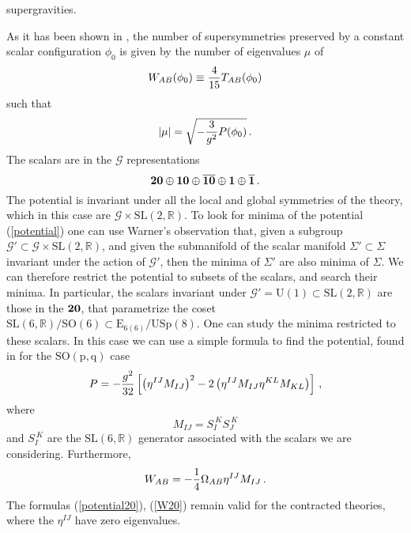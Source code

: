\documentclass[a4paper,12pt]{article}
\def\bar{\overline}\end {picture}}
\begin{document}
supergravities.
\par
As it has been shown in \cite{gunwar}, the number of
supersymmetries preserved by a constant scalar configuration
$\phi_0$ is given by the number of eigenvalues $\mu$ of
\begin{equation}
W_{AB}(\phi_0)\equiv {4\over 15}T_{AB}(\phi_0)
\end{equation}
such that
\begin{equation}
\left|\mu\right|=\sqrt{-{3\over g^2}P(\phi_0)}\,.
\end{equation}
The scalars are in the $\mathcal{G}$ representations
\begin{equation}
\bf 20\oplus 10\oplus\bar{10}\oplus 1\oplus\bar{1}\,.
\end{equation}
The potential is invariant under all the local and global
symmetries of the theory, which in this case are
$\mathcal{G}\times \mathrm{SL}(2,\mathbb{R})$. To look for minima
of the potential (\ref{potential}) one can use Warner's
observation \cite{schur} that, given a subgroup
$\mathcal{G}'\subset\mathcal{G}\times \mathrm{SL}(2,\mathbb{R})$,
and given the submanifold of the scalar manifold
$\Sigma'\subset\Sigma$ invariant under the action of
$\mathcal{G}'$, then the minima of $\Sigma'$ are also minima of
$\Sigma$. We can therefore restrict the potential to subsets of
the scalars, and search their minima. In particular, the scalars
invariant under $\mathcal{G}'=\mathrm{U(1)} \subset
\mathrm{SL}(2,\mathbb{R})$ are those in the $\bf 20$, that
parametrize the coset $\mathrm{SL}(6,\mathbb{R})/\mathrm{SO(6)}
\subset \mathrm{E_{6(6)}} /\mathrm{USp(8)}$. One can study the
minima restricted to these scalars. In this case we can use a
simple formula to find the potential, found in \cite{gunwar} for
the $\mathrm{SO(p,q)}$ case
\begin{equation}
\label{potential20} P=-{g^2\over
32}\left[\left(\eta^{IJ}M_{IJ}\right)^2-2\left(\eta^{IJ}M_{IJ}
\eta^{KL}M_{KL}\right)\right]\,,
\end{equation}
where
\begin{equation}
M_{IJ}=S_I^{~K}S_J^{~K}
\end{equation}
and $S_I^{~K}$ are the $\mathrm{SL}(6,\mathbb{R})$ generator
associated with the scalars we are considering. Furthermore,
\begin{equation}
W_{AB}=-{1\over 4}\Omega_{AB}\eta^{IJ}M_{IJ}\,. \label{W20}
\end{equation}
The formulas (\ref{potential20}), (\ref{W20}) remain valid for the
contracted theories, where the $\eta^{IJ}$ have zero eigenvalues.
\end{document}
